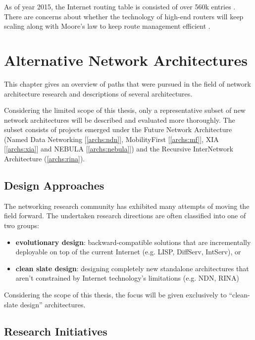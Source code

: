         As of year 2015, the Internet routing table is consisted of over 560k entries \cite{bgpgrow}. There are concerns about whether the technology of high-end routers will keep scaling along with Moore's law to keep route management efficient \cite{rfc4984}.


\chapter{Alternative Network Architectures}\label{archs}

    This chapter gives an overview of paths that were pursued in the field of network architecture research and descriptions of several architectures.

    Considering the limited scope of this thesis, only a representative subset of new network architectures will be described and evaluated more thoroughly. The subset consists of projects emerged under the Future Network Architecture (Named Data Networking [\ref{archs:ndn}], MobilityFirst [\ref{archs:mf}], XIA [\ref{archs:xia}] and NEBULA [\ref{archs:nebula}]) and the Recursive InterNetwork Architecture (\ref{archs:rina}).

    \section{Design Approaches}

        The networking research community has exhibited many attempts of moving the field forward. The undertaken research directions are often classified into one of two groups:

        \begin{itemize}
            \item \textbf{evolutionary design}: backward-compatible solutions that are incrementally deployable on top of the current Internet (e.g. LISP, DiffServ, IntServ), or
            \item \textbf{clean slate design}: designing completely new standalone architectures that aren't constrained by Internet technology's limitations (e.g. NDN, RINA)
        \end{itemize}

        Considering the scope of this thesis, the focus will be given exclusively to ``clean-slate design'' architectures.

    \section{Research Initiatives}

